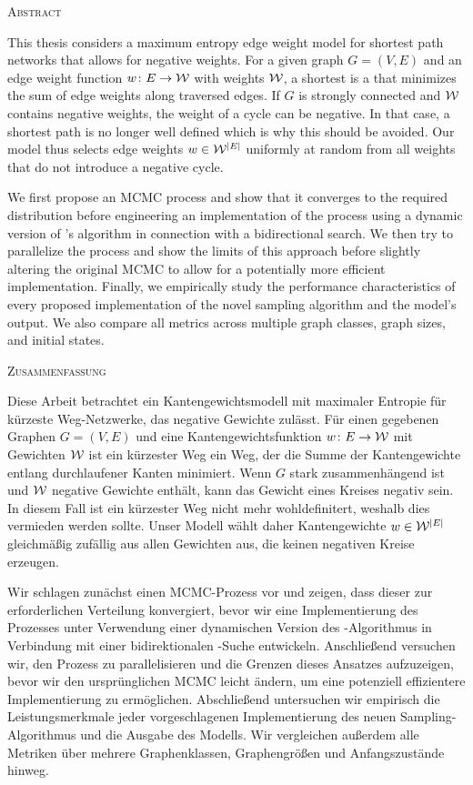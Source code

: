 \begin{center}
  \textsc{Abstract}
\end{center}

This thesis considers a maximum entropy edge weight model for shortest path networks that allows for negative weights.
For a given graph $G = (V, E)$ and an edge weight function $w\colon E \rightarrow \mathcal W$ with weights $\mathcal W$, a shortest  is a  that minimizes the sum of edge weights along traversed edges.
If $G$ is strongly connected and $\mathcal W$ contains negative weights, the weight of a cycle can be negative. 
In that case, a shortest path is no longer well defined which is why this should be avoided.
Our model thus selects edge weights $w \in \mathcal W^{|E|}$ uniformly at random from all weights that do not introduce a negative cycle.

We first propose an MCMC process and show that it converges to the required distribution before engineering an implementation of the process using a dynamic version of \algjs's algorithm in connection with a bidirectional \algdk search.
We then try to parallelize the process and show the limits of this approach before slightly altering the original MCMC to allow for a potentially more efficient implementation.
Finally, we empirically study the performance characteristics of every proposed implementation of the novel sampling algorithm and the model's output.
We also compare all metrics across multiple graph classes, graph sizes, and initial states.

\newpage
\begin{center}
  \textsc{Zusammenfassung}
\end{center}

Diese Arbeit betrachtet ein Kantengewichtsmodell mit maximaler Entropie für kürzeste Weg-Netzwerke, das negative Gewichte zulässt.
Für einen gegebenen Graphen $G = (V, E)$ und eine Kantengewichtsfunktion $w\colon E \rightarrow \mathcal W$ mit Gewichten $\mathcal W$ ist ein kürzester  Weg ein  Weg, der die Summe der Kantengewichte entlang durchlaufener Kanten minimiert.
Wenn $G$ stark zusammenhängend ist und $\mathcal W$ negative Gewichte enthält, kann das Gewicht eines Kreises negativ sein.
In diesem Fall ist ein kürzester Weg nicht mehr wohldefinitert, weshalb dies vermieden werden sollte.
Unser Modell wählt daher Kantengewichte $w \in \mathcal W^{|E|}$ gleichmäßig zufällig aus allen Gewichten aus, die keinen negativen Kreise erzeugen.

Wir schlagen zunächst einen MCMC-Prozess vor und zeigen, dass dieser zur erforderlichen Verteilung konvergiert, bevor wir eine Implementierung des Prozesses unter Verwendung einer dynamischen Version des \algjs-Algorithmus in Verbindung mit einer bidirektionalen \algdk-Suche entwickeln.
Anschließend versuchen wir, den Prozess zu parallelisieren und die Grenzen dieses Ansatzes aufzuzeigen, bevor wir den ursprünglichen MCMC leicht ändern, um eine potenziell effizientere Implementierung zu ermöglichen.
Abschließend untersuchen wir empirisch die Leistungsmerkmale jeder vorgeschlagenen Implementierung des neuen Sampling-Algorithmus und die Ausgabe des Modells.
Wir vergleichen außerdem alle Metriken über mehrere Graphenklassen, Graphengrößen und Anfangszustände hinweg.
